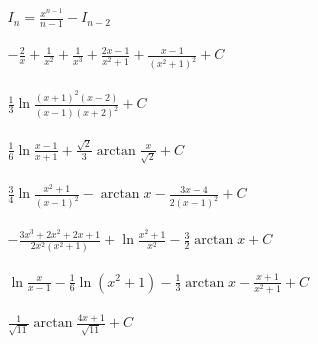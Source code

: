 \documentclass[11pt]{amsbook}
\begin{document}
\begin{hEnumerateArabic}

\setcounter{enumi}{3}
\item $\begin{aligned} I_{n} = \frac{x^{n-1}}{n-1} - I_{n-2}\end{aligned}$

\item $\begin{aligned}-\frac{2}{x} + \frac{1}{x^{2}} + \frac{1}{x^{3}} + \frac{2x-1}{x^{2}+1} + \frac{x-1}{(x^{2}+1)^{2}} + C\end{aligned}$

\item
\begin{hEnumerateAlpha}
\item $\begin{aligned}\frac{1}{3}\ln\frac{(x+1)^{2}(x-2)}{(x-1)(x+2)^{2}} + C\end{aligned}$
\item $\begin{aligned}\frac{1}{6}\ln\frac{x-1}{x+1} + \frac{\sqrt{2}}{3}\arctan\frac{x}{\sqrt{2}} + C\end{aligned}$
\item $\begin{aligned}\frac{3}{4}\ln\frac{x^{2}+1}{(x-1)^{2}} - \arctan{x} - \frac{3x-4}{2(x-1)^2} + C\end{aligned}$
\end{hEnumerateAlpha}

\item $\begin{aligned}-\frac{3x^{3}+2x^{2}+2x+1}{2x^{2}(x^{2}+1)} + \ln\frac{x^{2}+1}{x^{2}} - \frac{3}{2}\arctan{x} + C\end{aligned}$

\item
\begin{hEnumerateAlpha}
\item $\begin{aligned}\ln\frac{x}{x-1} - \frac{1}{6}\ln{(x^{2}+1)} - \frac{1}{3}\arctan{x} - \frac{x+1}{x^{2}+1} + C\end{aligned}$
\item $\begin{aligned}\frac{1}{\sqrt{11}}\arctan\frac{4x+1}{\sqrt{11}} + C\end{aligned}$
\end{hEnumerateAlpha}


\end{hEnumerateArabic}
\end{document}
